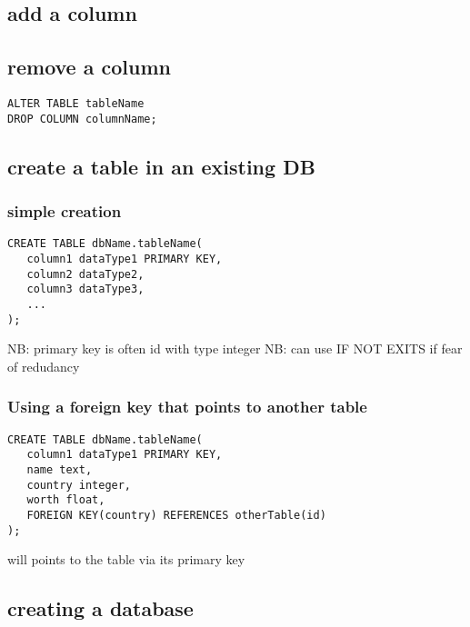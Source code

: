 \subsection{add a column}
	

	\subsection{remove a column}

\begin{lstlisting}
ALTER TABLE tableName
DROP COLUMN columnName;
\end{lstlisting}


	\subsection{create a table in an existing DB}

		\subsubsection{simple creation}

\begin{lstlisting}
CREATE TABLE dbName.tableName(
   column1 dataType1 PRIMARY KEY,
   column2 dataType2,
   column3 dataType3,
   ...
);
\end{lstlisting}

			NB: primary key is often id with type integer
			NB: can use IF NOT EXITS if fear of redudancy

		\subsubsection{Using a foreign key that points to another table}

\begin{lstlisting}
CREATE TABLE dbName.tableName(
   column1 dataType1 PRIMARY KEY,
   name text,
   country integer,
   worth float,
   FOREIGN KEY(country) REFERENCES otherTable(id)
);
\end{lstlisting}

		will points to the table  via its primary key 


	\subsection{creating a database}
		
